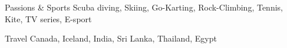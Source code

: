 

\begin{cvskills}

	\cvskill
		{Passions \& Sports} %
		{Scuba diving, Skiing, Go-Karting, Rock-Climbing, Tennis, Kite, TV series, E-sport} %

	\cvskill
		{Travel} %
		{Canada, Iceland, India, Sri Lanka, Thailand, Egypt} %


\end{cvskills}
